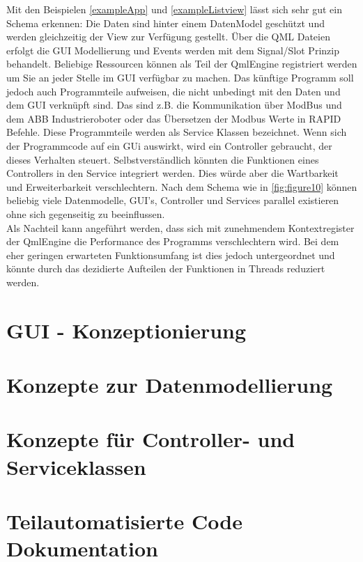 Mit den Beispielen \ref{exampleApp} und \ref{exampleListview} lässt sich sehr gut ein Schema erkennen:
Die Daten sind hinter einem DatenModel geschützt und werden gleichzeitig der View zur Verfügung gestellt.
Über die QML Dateien erfolgt die GUI Modellierung und Events werden mit dem Signal/Slot Prinzip behandelt.
Beliebige Ressourcen können als Teil der QmlEngine registriert werden um Sie an jeder Stelle im GUI verfügbar zu machen.
Das künftige Programm soll jedoch auch Programmteile aufweisen, die nicht unbedingt mit den Daten und dem GUI verknüpft sind.
Das sind z.B. die Kommunikation über ModBus und dem ABB Industrieroboter oder das Übersetzen der Modbus Werte in
RAPID Befehle.
Diese Programmteile werden als Service Klassen bezeichnet.
Wenn sich der Programmcode auf ein GUi auswirkt, wird ein Controller gebraucht, der dieses Verhalten steuert.
Selbstverständlich könnten die Funktionen eines Controllers in den Service integriert werden.
Dies würde aber die Wartbarkeit und Erweiterbarkeit verschlechtern.
Nach dem Schema wie in \ref{fig:figure10} können beliebig viele Datenmodelle, GUI's, Controller und Services
parallel existieren ohne sich gegenseitig zu beeinflussen.\\
Als Nachteil kann angeführt werden, dass sich mit zunehmendem Kontextregister der QmlEngine die Performance des Programms
verschlechtern wird.
Bei dem eher geringen erwarteten Funktionsumfang ist dies jedoch untergeordnet und könnte durch das dezidierte Aufteilen der
Funktionen in Threads reduziert werden.

\section{GUI - Konzeptionierung}

\section{Konzepte zur Datenmodellierung}

\section{Konzepte für Controller- und Serviceklassen}

\section{Teilautomatisierte Code Dokumentation}
